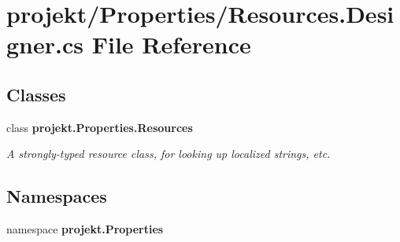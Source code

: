 \section{projekt/\+Properties/\+Resources.Designer.\+cs File Reference}
\label{Resources_8Designer_8cs}
\subsection*{Classes}
\begin{DoxyCompactItemize}
\item 
class {\bfseries projekt.\+Properties.\+Resources}
\begin{DoxyCompactList}\small\item\em A strongly-\/typed resource class, for looking up localized strings, etc. \end{DoxyCompactList}\end{DoxyCompactItemize}
\subsection*{Namespaces}
\begin{DoxyCompactItemize}
\item 
namespace \textbf{ projekt.\+Properties}
\end{DoxyCompactItemize}
